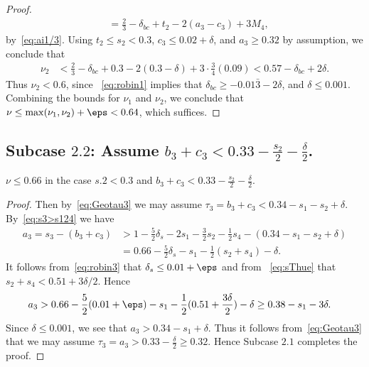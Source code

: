 \begin{proof}
\begin{align*}
  & = \frac{2}{3} -\delta_{bc}+ t_2 - 2(a_3-c_3) +3M_4,
  \end{align*}
  by~\eqref{eq:ai1/3}. Using
  $t_2\le s_2< 0.3$, $c_3\le 0.02+\delta$, and $a_3\ge 0.32$ by assumption, we conclude that
  \begin{align*}
  \nu_2
  & < \frac{2}{3} -\delta_{bc} + 0.3 - 2(0.3-\delta) + 3\cdot\frac{3}{4}(0.09) <
  0.57-\delta_{bc}+2\delta.
  \end{align*}
  Thus $\nu_2<0.6$, since
  ~\eqref{eq:robin1} implies that $\delta_{bc}\geq -0.01\bar3-2\delta$, and $\delta\leq 0.001$. Combining the bounds for $\nu_1$ and $\nu_2$, we conclude that $\nu \le \max(\nu_1,\nu_2)+\eps<0.64$, which suffices.
\end{proof}


\subsection*{Subcase $\mathbf{2.2}$: Assume
$b_3+c_3<0.33-\frac{s_2}{2}-\frac{\delta}{2}$.}

\begin{lemma}\label{lem:Subcase2.2}
  \leanok
  $\nu \leq 0.66$ in the case $s.2 < 0.3$ and $b_3+c_3<0.33-\frac{s_2}{2}-\frac{\delta}{2}$.
\end{lemma}
\begin{proof}
  \leanok
  Then by~\eqref{eq:Geotau3} we may assume $\tau_3=b_3+c_3<0.34-s_1-s_2+\delta$. By~\eqref{eq:s3>s124} we have
  \begin{align*}
  a_3 = s_3 - (b_3+c_3) &> 1 - \frac{5}{2}\delta_s - 2s_1 - \frac{3}{2}s_2 - \frac{1}{2}s_4 - (0.34-s_1-s_2+ \delta)\\
  & = 0.66- \frac{5}{2}\delta_s - s_1 - \frac{1}{2}(s_2+s_4)-\delta.
  \end{align*}
  It follows from~\eqref{eq:robin3} that $\delta_s\leq 0.01+\eps$ and from
  ~\eqref{eq:sThue} that $s_2+s_4<0.51+3\delta/2$. Hence
  \begin{align*}
  a_3
  & > 0.66- \frac{5}{2}(0.01+\eps) - s_1 - \frac{1}{2}(0.51+\frac{3\delta}{2}) - \delta \ge 0.38-s_1- 3\delta.
  \end{align*}
  Since $\delta\le 0.001$, we see that $a_3> 0.34-s_1+ \delta$.
  Thus it follows from~\eqref{eq:Geotau3} that we may assume $\tau_3=a_3>0.33-\frac{\delta}{2}\geq 0.32$. Hence Subcase
  $\mathbf{2.1}$ completes the proof.
\end{proof}



